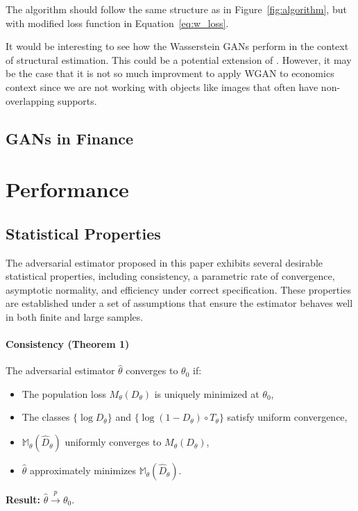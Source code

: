\documentclass[12pt]{article}
\begin{document}
The algorithm should follow the same structure as in
Figure~\ref{fig:algorithm}, but with modified loss function in
Equation~\eqref{eq:w_loss}.

It would be interesting to see how the Wasserstein GANs perform in the context
of structural estimation. This could be a potential extension of
\citet{kaji2023adversarial}. However, it may be the case that it is not so much
improvment to apply WGAN to economics context since we are not working with
objects like images that often have non-overlapping supports.

\subsection{GANs in Finance}

\section{Performance} \label{sec:performance}

\subsection{Statistical Properties} \label{subsec:statistical_properties}

The adversarial estimator proposed in this paper exhibits several desirable
statistical properties, including consistency, a parametric rate of
convergence, asymptotic normality, and efficiency under correct specification.
These properties are established under a set of assumptions that ensure the
estimator behaves well in both finite and large samples.

\paragraph{Consistency (Theorem 1)} The adversarial estimator \(\hat{\theta}\) converges to \(\theta_0\) if:
\begin{itemize}
    \item The population loss \(M_\theta(D_\theta)\) is uniquely minimized at
          \(\theta_0\),
    \item The classes \(\{\log D_\theta\}\) and \(\{\log(1 - D_\theta) \circ T_\theta\}\)
          satisfy uniform convergence,
    \item \(\mathbb{M}_\theta(\hat{D}_\theta)\) uniformly converges to \(M_\theta(D_\theta)\),
    \item \(\hat{\theta}\) approximately minimizes \(\mathbb{M}_\theta(\hat{D}_\theta)\).
\end{itemize}
\textbf{Result:} \(\hat{\theta} \xrightarrow{p} \theta_0\).
\end{document}
